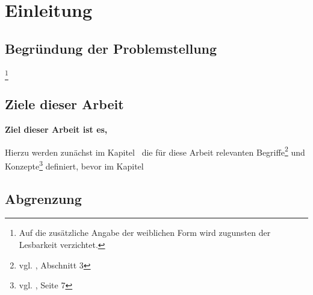 \section{Einleitung}
\label{sec:einleitung}

\subsection{Begründung der Problemstellung}
\label{sec:problemstellung}

\lipsum[1]\footnote{Auf die zusätzliche Angabe der weiblichen Form wird zugunsten der Lesbarkeit verzichtet.}

\subsection{Ziele dieser Arbeit}
\label{sec:ziele}

\textbf{Ziel dieser Arbeit ist es, \lipsum[2]}

Hierzu werden zunächst im Kapitel~ die für diese Arbeit relevanten Begriffe\footnote{vgl. , Abschnitt 3} und Konzepte\footnote{vgl. \cite{orwell}, Seite 7} definiert, bevor im Kapitel~

\lipsum[3]

\subsection{Abgrenzung}
\label{sec:abgrenzung}

\lipsum[14]








